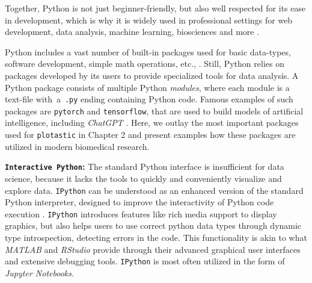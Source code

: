 Together, Python is not just beginner-friendly, but also well respected for its
ease in development, which is why it is widely used in professional settings for
web development, data analysis, machine learning, biosciences and more
\cite{ekmekciIntroductionProgrammingBioscientists2016,rayhanRisePythonSurvey2023}.



%
\label{sec:intro_python_packages}%
Python includes a vast number of built-in packages used for basic data-types,
software development, simple math operations, etc.,
\cite{PythonLanguageReference2024}. Still, Python relies on packages developed
by its users to provide specialized tools for data analysis. A Python package
consists of multiple Python \emph{modules}, where each module is a text-file
with~a~\texttt{.py} ending containing Python code. Famous examples of such
packages are \texttt{pytorch} and \texttt{tensorflow}, that are used to build
models of artificial intelligence, including \textit{ChatGPT}
\cite{paszkePyTorchImperativeStyle2019, abadiTensorFlowLargeScaleMachine2016,
OpenaiGpt22024}. Here, we outlay the most important packages used
for \texttt{plotastic} in Chapter 2 and present examples how these packages are
utilized in modern biomedical research.

\textbf{\texttt{\textbf Interactive Python}:} The standard Python interface is
insufficient for data science, because it lacks the tools to quickly and
conveniently visualize and explore data. \texttt{IPython} can be understood as
an enhanced version of the standard Python interpreter, designed to improve the
interactivity of Python code execution \cite{perezIPythonSystemInteractive2007}.
\texttt{IPython} introduces features like rich media support to display
graphics, but also helps users to use correct python data types through dynamic
type introspection, detecting errors in the code. This functionality is akin to
what \textit{MATLAB} and \textit{RStudio} provide through their advanced
graphical user interfaces and extensive debugging tools. \texttt{IPython} is most
often utilized in the form of \emph{Jupyter Notebooks}.




